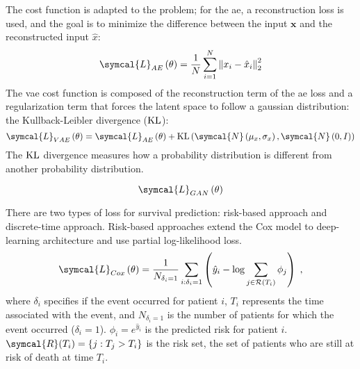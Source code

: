 \documentclass[../main.tex]{subfiles}
\begin{document}
	 The cost function is adapted to the problem; for the \gls{ae}, a reconstruction loss is used, and the goal is to minimize the difference between the input \(\symbf{x}\) and the reconstructed input \(\hat{x}\):
	 \begin{equation}
		 \symcal{L}_{AE}\left(\theta\right) = \frac{1}{N}\sum_{i=1}^{N} {\left\|x_i - \hat{x}_i \right\|}_2^{2} \label{eq:loss_ae}
	 \end{equation}
	 The \gls{vae} cost function is composed of the reconstruction term of the \gls{ae} loss and a regularization term that forces the latent space to follow a gaussian distribution: the Kullback-Leibler divergence (\(\operatorname{KL}\)):
	 \begin{equation}
		 \symcal{L}_{VAE}\left(\theta\right) = \symcal{L}_{AE}\left(\theta\right) + \KL\left(\symcal{N}\left(\mu_{x}, \sigma_{x}\right), \symcal{N}\left(0, I\right)\right)
	 \end{equation}
	 The \(\operatorname{KL}\) divergence measures how a probability distribution is different from another probability distribution.

	 \begin{equation}
		 \symcal{L}_{GAN}\left(\theta\right)
	 \end{equation}

	 There are two types of loss for survival prediction: risk-based approach and discrete-time approach.
	 Risk-based approaches extend the Cox model to deep-learning architecture and use partial log-likelihood loss.
	 \begin{equation}
		 \symcal{L}_{Cox}\left(\theta\right) = \frac{1}{N_{\delta_i = 1}} \sum_{i:\delta_i=1} \left(\hat{y}_i - \log \sum_{j \in \mathcal{R}(T_i)}\phi_j \right)\; \text{,} \label{eq:cox_loss}
	 \end{equation}
	 where \(\delta_i\) specifies if the event occurred for patient \(i\), \(T_i\) represents the time associated with the event, and \(N_{\delta_i = 1}\) is the number of patients for which the event occurred (\(\delta_i = 1\)).
	 \(\phi_i = e^{\hat{y}_i}\) is the predicted risk for patient \(i\).
	 \(\symcal{R}(T_i) = \{j: T_j > T_i\}\) is the risk set, the set of patients who are still at risk of death at time \(T_i\).
\end{document}
